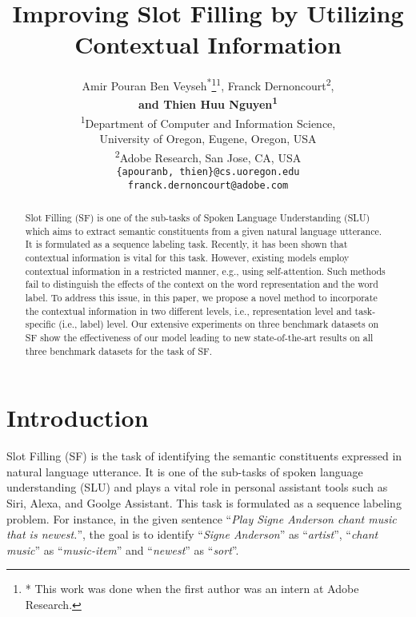 \documentclass[11pt,a4paper]{article}
\title{Improving Slot Filling by Utilizing Contextual Information}
\author{
Amir Pouran Ben Veyseh\textsuperscript{*}\thanks{* This work was done when the first author was an intern at Adobe Research.}\textsuperscript{\rm 1}, Franck Dernoncourt\textsuperscript{\rm 2}, \\
{\bf and Thien Huu Nguyen\textsuperscript{\rm 1}} \\
\textsuperscript{\rm 1}Department of Computer and Information Science, \\ University of Oregon, Eugene, Oregon, USA\\
\textsuperscript{\rm 2}Adobe Research, San Jose, CA, USA\\
{\tt \{apouranb, thien\}@cs.uoregon.edu} \\
{\tt franck.dernoncourt@adobe.com}
}
\date{}
\begin{document}
\maketitle
\begin{abstract}
Slot Filling (SF) is one of the sub-tasks of Spoken Language Understanding (SLU) which aims to extract semantic constituents from a given natural language utterance. It is formulated as a sequence labeling task. Recently, it has been shown that contextual information is vital for this task. However, existing models employ contextual information in a restricted manner, e.g., using self-attention.
Such methods fail to distinguish the effects of the context on the word representation and the word label. To address this issue, in this paper, we propose a novel method to incorporate the contextual information in two different levels, i.e., representation level and task-specific (i.e., label) level. Our extensive experiments on three benchmark datasets on SF show the effectiveness of our model leading to new state-of-the-art results on all three benchmark datasets for the task of SF.


\end{abstract}

\section{Introduction}

Slot Filling (SF) is the task of identifying the semantic constituents expressed in natural language utterance. It is one of the sub-tasks of spoken language understanding (SLU) and plays a vital role in personal assistant tools such as Siri, Alexa, and Goolge Assistant. This task is formulated as a sequence labeling problem. For instance, in the given sentence ``\textit{Play Signe Anderson chant music that is newest.}'', the goal is to identify ``\textit{Signe Anderson}'' as ``\textit{artist}'', ``\textit{chant music}'' as ``\textit{music-item}'' and ``\textit{newest}'' as ``\textit{sort}''.
\end{document}
